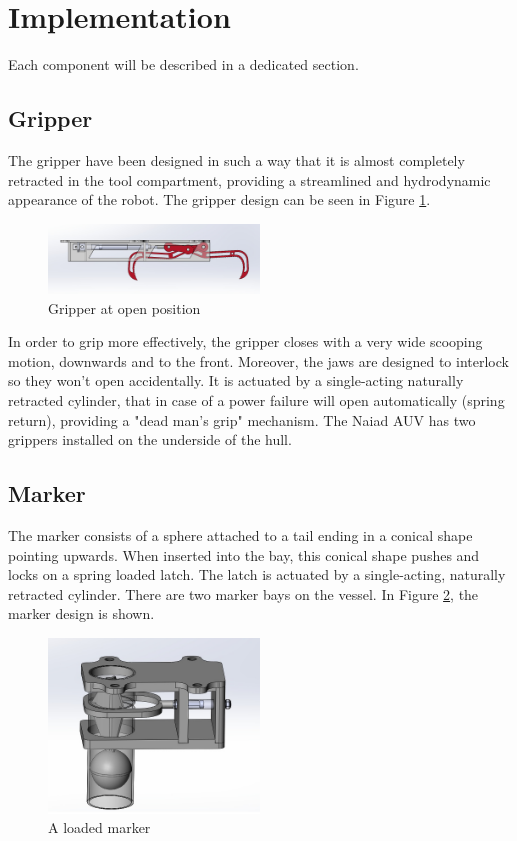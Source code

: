 \section{Implementation}\label{sec:implementation}
Each component will be described in a dedicated section.

\subsection{Gripper}
The gripper have been designed in such a way that it is almost completely retracted in the tool compartment, providing a streamlined and hydrodynamic appearance of the robot. The gripper design can be seen in Figure \ref{fig:gripper}.

\begin{figure}[t]
    \includegraphics[width=0.5\textwidth]{./figure/gripper_open.png}
    \caption{Gripper at open position}
    \label{fig:gripper}
\end{figure}

In order to grip more effectively, the gripper closes with a very wide scooping motion, downwards and to the front. Moreover, the jaws are designed to interlock so they won't open accidentally. It is actuated by a single-acting naturally retracted cylinder, that in case of a power failure will open automatically (spring return), providing a "dead man's grip" mechanism. The Naiad AUV has two grippers installed on the underside of the hull.

\subsection{Marker}
The marker consists of a sphere attached to a tail ending in a conical shape pointing upwards. When inserted into the bay, this conical shape pushes and locks on a spring loaded latch. The latch is actuated by a single-acting, naturally retracted cylinder. There are two marker bays on the vessel. In Figure \ref{fig:marker}, the marker design is shown.

\begin{figure}[!t]
    \includegraphics[width=0.5\textwidth]{./figure/marker_loaded.png}
    \caption{A loaded marker}
    \label{fig:marker}
\end{figure}

